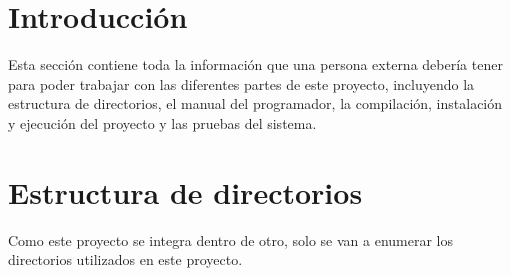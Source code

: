 
\section{Introducción}

Esta sección contiene toda la información que una persona externa debería tener para poder trabajar con las diferentes partes de este proyecto, incluyendo la estructura de directorios, el manual del programador, la compilación, instalación y ejecución del proyecto y las pruebas del sistema.

\section{Estructura de directorios}

Como este proyecto se integra dentro de otro, solo se van a enumerar los directorios utilizados en este proyecto.

\newpage

